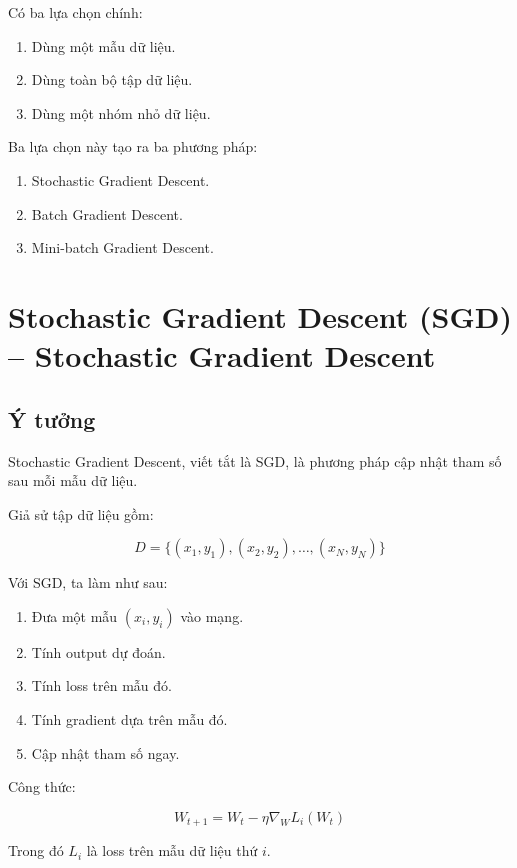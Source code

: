 Có ba lựa chọn chính:

\begin{enumerate}
    \item Dùng một mẫu dữ liệu.
    \item Dùng toàn bộ tập dữ liệu.
    \item Dùng một nhóm nhỏ dữ liệu.
\end{enumerate}

Ba lựa chọn này tạo ra ba phương pháp:

\begin{enumerate}
    \item Stochastic Gradient Descent.
    \item Batch Gradient Descent.
    \item Mini-batch Gradient Descent.
\end{enumerate}

\section{Stochastic Gradient Descent (SGD) -- Stochastic Gradient Descent}

\subsection{Ý tưởng}

Stochastic Gradient Descent, viết tắt là SGD, là phương pháp cập nhật tham số sau mỗi mẫu dữ liệu.

Giả sử tập dữ liệu gồm:

\[
    D=\{(x_1,y_1),(x_2,y_2),\ldots,(x_N,y_N)\}
\]

Với SGD, ta làm như sau:

\begin{enumerate}
    \item Đưa một mẫu $(x_i,y_i)$ vào mạng.
    \item Tính output dự đoán.
    \item Tính loss trên mẫu đó.
    \item Tính gradient dựa trên mẫu đó.
    \item Cập nhật tham số ngay.
\end{enumerate}

Công thức:

\[
    W_{t+1}
    =
    W_t
    -
    \eta \nabla_W L_i(W_t)
\]

Trong đó $L_i$ là loss trên mẫu dữ liệu thứ $i$.

